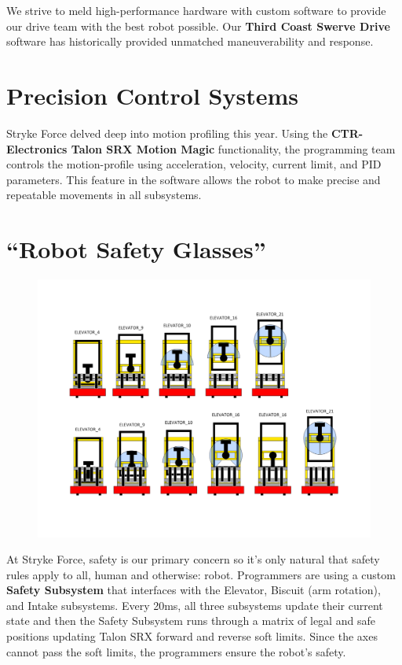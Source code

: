 \documentclass[10pt,tumble]{leaflet}
\begin{document}
We strive to meld high-performance hardware with custom software to provide our drive team with the best robot possible. Our \textbf{Third Coast Swerve Drive} software has historically provided unmatched maneuverability and response.

\section{Precision Control Systems}

Stryke Force delved deep into motion profiling this year.  Using the \textbf{CTR-Electronics Talon SRX Motion Magic} functionality, the programming team controls the motion-profile using acceleration, velocity, current limit, and PID parameters.  This feature in the software allows the robot to make precise and repeatable movements in all subsystems.

\section{``Robot Safety Glasses''}

\begin{figure}[H]
	\centering
	\includegraphics[scale=0.3]{assets/safety}
\end{figure}

At Stryke Force, safety is our primary concern so it's only natural that safety rules apply to all, human and otherwise: robot. Programmers are using a custom \textbf{Safety Subsystem} that interfaces with the Elevator, Biscuit (arm rotation), and Intake subsystems. Every 20ms, all three subsystems update their current state and then the Safety Subsystem runs through a matrix of legal and safe positions updating Talon SRX forward and reverse soft limits. Since the axes cannot pass the soft limits, the programmers ensure the robot's safety.
\end{document}
